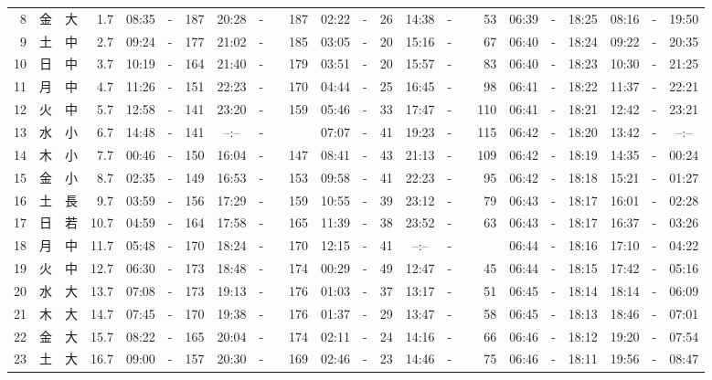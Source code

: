 \documentclass[12pt,a4j]{jsarticle}
\begin{document}
\begin{table}[htbp]
\begin{center}
{\begin{tabular}{|rc|cr|ccrccr|ccrccr|ccc|ccc|}
 8 & 金 & 大 &  1.7 &  08:35 &-& 187 &  20:28 &-& 187 &  02:22 &-&  26 &  14:38 &-&  53 & 06:39 & -& 18:25 & 08:16 & -& 19:50 \\
 9 & 土 & 中 &  2.7 &  09:24 &-& 177 &  21:02 &-& 185 &  03:05 &-&  20 &  15:16 &-&  67 & 06:40 & -& 18:24 & 09:22 & -& 20:35 \\
10 & 日 & 中 &  3.7 &  10:19 &-& 164 &  21:40 &-& 179 &  03:51 &-&  20 &  15:57 &-&  83 & 06:40 & -& 18:23 & 10:30 & -& 21:25 \\
11 & 月 & 中 &  4.7 &  11:26 &-& 151 &  22:23 &-& 170 &  04:44 &-&  25 &  16:45 &-&  98 & 06:41 & -& 18:22 & 11:37 & -& 22:21 \\
12 & 火 & 中 &  5.7 &  12:58 &-& 141 &  23:20 &-& 159 &  05:46 &-&  33 &  17:47 &-& 110 & 06:41 & -& 18:21 & 12:42 & -& 23:21 \\
13 & 水 & 小 &  6.7 &  14:48 &-& 141 &  --:-- &-&~~~~~ &  07:07 &-&  41 &  19:23 &-& 115 & 06:42 & -& 18:20 & 13:42 & -& --:-- \\
14 & 木 & 小 &  7.7 &  00:46 &-& 150 &  16:04 &-& 147 &  08:41 &-&  43 &  21:13 &-& 109 & 06:42 & -& 18:19 & 14:35 & -& 00:24 \\
15 & 金 & 小 &  8.7 &  02:35 &-& 149 &  16:53 &-& 153 &  09:58 &-&  41 &  22:23 &-&  95 & 06:42 & -& 18:18 & 15:21 & -& 01:27 \\
16 & 土 & 長 &  9.7 &  03:59 &-& 156 &  17:29 &-& 159 &  10:55 &-&  39 &  23:12 &-&  79 & 06:43 & -& 18:17 & 16:01 & -& 02:28 \\
17 & 日 & 若 & 10.7 &  04:59 &-& 164 &  17:58 &-& 165 &  11:39 &-&  38 &  23:52 &-&  63 & 06:43 & -& 18:17 & 16:37 & -& 03:26 \\
18 & 月 & 中 & 11.7 &  05:48 &-& 170 &  18:24 &-& 170 &  12:15 &-&  41 &  --:-- &-&~~~~~ & 06:44 & -& 18:16 & 17:10 & -& 04:22 \\
19 & 火 & 中 & 12.7 &  06:30 &-& 173 &  18:48 &-& 174 &  00:29 &-&  49 &  12:47 &-&  45 & 06:44 & -& 18:15 & 17:42 & -& 05:16 \\
20 & 水 & 大 & 13.7 &  07:08 &-& 173 &  19:13 &-& 176 &  01:03 &-&  37 &  13:17 &-&  51 & 06:45 & -& 18:14 & 18:14 & -& 06:09 \\
21 & 木 & 大 & 14.7 &  07:45 &-& 170 &  19:38 &-& 176 &  01:37 &-&  29 &  13:47 &-&  58 & 06:45 & -& 18:13 & 18:46 & -& 07:01 \\
22 & 金 & 大 & 15.7 &  08:22 &-& 165 &  20:04 &-& 174 &  02:11 &-&  24 &  14:16 &-&  66 & 06:46 & -& 18:12 & 19:20 & -& 07:54 \\
23 & 土 & 大 & 16.7 &  09:00 &-& 157 &  20:30 &-& 169 &  02:46 &-&  23 &  14:46 &-&  75 & 06:46 & -& 18:11 & 19:56 & -& 08:47 \\

\end{tabular}}
\end{center}
\end{table}
\end{document}

